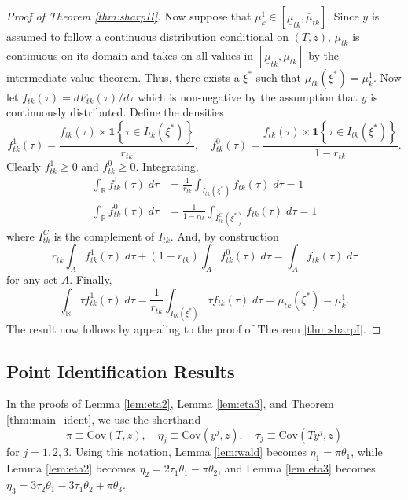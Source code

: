 \begin{proof}[Proof of Theorem \ref{thm:sharpII}]
Now suppose that $\mu^1_{k} \in \left[\underline{\mu}_{tk}, \overline{\mu}_{tk} \right]$.
Since $y$ is assumed to follow a continuous distribution conditional on $(T,z)$, $\mu_{tk}$ is continuous on its domain and takes on all values in $\left[ \underline{\mu}_{tk}, \overline{\mu}_{tk} \right]$ by the intermediate value theorem.
Thus, there exists a $\xi^*$ such that $\mu_{tk}(\xi^*) = \mu^1_{k}$.
Now let $f_{tk}(\tau) = dF_{tk}(\tau)/d\tau$ which is non-negative by the assumption that $y$ is continuously distributed.
Define the densities
\[
  f^1_{tk}(\tau) = \frac{f_{tk}(\tau)\times \mathbf{1}\left\{ \tau \in I_{tk}(\xi^*) \right\}}{r_{tk}}, \quad
  f^0_{tk}(\tau) = \frac{f_{tk}(\tau) \times \mathbf{1}\left\{ \tau \in I_{tk}(\xi^*) \right\}}{1 - r_{tk}}.
\]
Clearly $f_{tk}^1\geq 0$ and $f^0_{tk} \geq 0$.
Integrating, 
\begin{align*}
  \int_{\mathbb{R}} f_{tk}^1(\tau) \; d\tau &= \frac{1}{r_{tk}}\int_{I_{tk}(\xi^*)} f_{tk}(\tau)\; d\tau = 1\\
  \int_{\mathbb{R}} f_{tk}^0(\tau) \; d\tau &= \frac{1}{1 - r_{tk}}\int_{I^C_{tk}(\xi^*)} f_{tk}(\tau)\; d\tau = 1
\end{align*}
where $I_{tk}^C$ is the complement of $I_{tk}$.
And, by construction
\[
  r_{tk} \int_A f_{tk}^1(\tau) \; d\tau + (1 - r_{tk}) \int_A f_{tk}^0(\tau) \; d\tau = \int_A f_{tk}(\tau)\; d\tau
\]
for any set $A$. 
Finally,
\[
  \int_{\mathbb{R}} \tau f_{tk}^1(\tau) \; d\tau = \frac{1}{r_{tk}} \int_{I_{tk}(\xi^*)} \tau f_{tk}(\tau)\; d\tau = \mu_{tk}(\xi^*) = \mu^1_{k}.
\]
The result now follows by appealing to the proof of Theorem \ref{thm:sharpI}.

\end{proof}

\subsection{Point Identification Results}
In the proofs of Lemma \ref{lem:eta2}, Lemma \ref{lem:eta3}, and Theorem \ref{thm:main_ident}, we use the shorthand
\[
  \pi \equiv \mbox{Cov}(T,z), \quad
  \eta_j \equiv \mbox{Cov}(y^j,z), \quad
  \tau_j \equiv \mbox{Cov}(Ty^j,z)
\]
for $j = 1, 2, 3$.
Using this notation, Lemma \ref{lem:wald} becomes $\eta_1 = \pi\theta_1$, while Lemma \ref{lem:eta2} becomes $\eta_2 =  2\tau_1 \theta_1 - \pi \theta_2$, 
and Lemma \ref{lem:eta3} becomes $\eta_3 = 3\tau_2 \theta_1 - 3\tau_1 \theta_2 + \pi\theta_3$.


